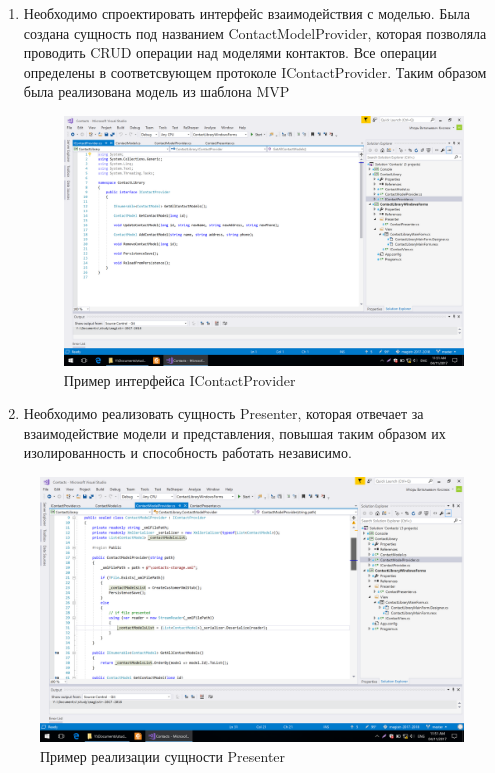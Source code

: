 \documentclass[14pt,a4paper]{extreport}
\begin{document}
\fontsize{14pt}{14pt}\selectfont

\begin{enumerate}

\item Необходимо спроектировать интерфейс взаимодействия с моделью. Была создана сущность под названием ContactModelProvider, которая позволяла проводить CRUD операции над моделями контактов. Все операции определены в соответсвующем протоколе IContactProvider. Таким образом была реализована модель из шаблона MVP
\begin{figure}[h]
\includegraphics[scale=0.5]{../screenshots/Screenshot_1}
\caption{Пример интерфейса IContactProvider}
\end{figure}

\item Необходимо реализовать сущность Presenter, которая отвечает за взаимодействие модели и представления, повышая таким образом их изолированность и способность работать независимо.
\end{enumerate}


\begin{figure}[h]
\includegraphics[scale=0.5]{../screenshots/Screenshot_2}
\caption{Пример реализации сущности Presenter}
\end{figure}
\end{document}
